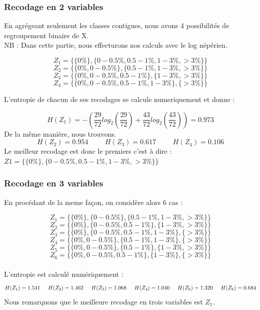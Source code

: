 \documentclass{article}
\begin{document}
\subsubsection{Recodage en 2 variables}

En agrégeant seulement les classes contigues, nous avons 4 possibilités de regroupement binaire de 
X.
\\
 NB : Dans cette partie, nous effecturons nos calculs avec le log népérien.


\[
Z_1 =\{ \{0 \% \} , \{0 - 0.5 \% ,0.5-1 \% ,1-3 \% ,>3 \% \} \}  
\]
\[
Z_2 =\{ \{0 \% , 0 - 0.5 \%  \} , \{0.5-1 \% ,1-3 \% ,>3 \% \} \}
\]
\[
Z_3 =\{ \{0 \%, 0 - 0.5 \% ,0.5-1 \%  \} , \{1-3 \% ,>3 \% \} \}
\]
\[
Z_4 =\{ \{0 \% , 0 - 0.5 \% ,0.5-1 \% ,1-3 \% \} , \{>3 \% \} \}
\]


L'entropie de chacun de ses recodages se calcule numeriquement et donne :

\[
H(Z_1) = -\left(\frac{29}{72}log_2(\frac{29}{72})+\frac{43}{72}log_2(\frac{43}{72})\right) = 0.973
\]
De la même manière, nous trouvons.
\[
H(Z_2) = 0.954 \hspace{1cm} H(Z_3) = 0.617 \hspace{1cm} H(Z_4) = 0.106
\]
Le meilleur recodage est donc le premiers c'est à dire :
$Z1 =\{ \{0 \% \} , \{0 - 0.5 \% ,0.5-1 \% ,1-3 \% ,>3 \% \} \}$


\subsubsection{Recodage en 3 variables}

En procédant de la meme façon, on considère alors 6 cas :

\[
Z_1 =\{ \{0 \% \} , \{0 - 0.5 \%\} ,\{0.5-1 \% ,1-3 \% ,>3 \% \} \}  
\]
\[
  Z_2 =\{ \{0 \% \} , \{0 - 0.5\%, 0.5-1 \% \} ,\{1-3 \% ,>3 \% \} \}
\]
\[
  Z_3 =\{ \{0 \% \} , \{0 - 0.5\%, 0.5-1 \% ,1-3 \%  \} ,\{>3 \% \} \}
\]
\[
  Z_4 =\{ \{0 \%, 0 - 0.5\%\} , \{ 0.5-1 \% ,1-3 \%  \} ,\{>3 \% \} \}
\]
\[
  Z_5 =\{ \{0 \%, 0 - 0.5\%\} , \{ 0.5-1 \% \} ,\{1-3 \% , >3 \% \} \}
\]
\[
  Z_6 =\{ \{0 \%, 0 - 0.5\%,  0.5-1 \% \} , \{1-3 \%  \} ,\{>3 \% \} \}
\]
\\
L'entropie est calculé numériquement :
\[
H(Z_1) = 1.541 \hspace{0.5cm} H(Z_2) = 1.462 \hspace{0.5cm} H(Z_3) = 1.068 \hspace{0.5cm} H(Z_4) = 1.040 \hspace{0,5cm} H(Z_5) = 1.320 \hspace{0,5 cm} H(Z_6) = 0.684
\]
Nous remarquons que le meilleure recodage en trois variables est $Z_1$.
\end{document}
